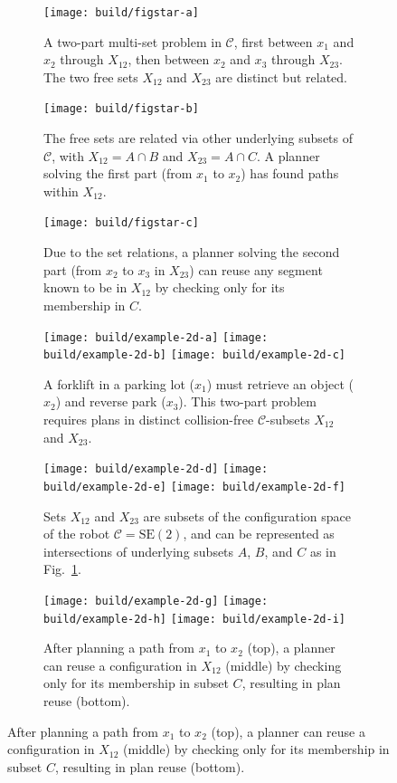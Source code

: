\begin{figure}
\begin{widepage}
\centering

\begin{subfigure}[t]{.32\linewidth}
\centering
\texttt{[image: build/figstar-a]}
\caption{A two-part multi-set problem in $\mathcal{C}$,
  first between $x_1$ and $x_2$ through $X_{12}$,
  then between $x_2$ and $x_3$ through $X_{23}$.
  The two free sets $X_{12}$ and $X_{23}$ are distinct
  but related.}
\end{subfigure}%
\quad%
\begin{subfigure}[t]{.32\linewidth}
\centering
\texttt{[image: build/figstar-b]}
\caption{The free sets are related via other underlying
  subsets of $\mathcal{C}$, with $X_{12}=A \cap B$
  and $X_{23}=A \cap C$.
  A planner solving the first part (from $x_1$ to $x_2$)
  has found paths within $X_{12}$.}
\label{subfig:figstar-intersections}
\end{subfigure}%
\quad%
\begin{subfigure}[t]{.32\linewidth}
\centering
\texttt{[image: build/figstar-c]}
\caption{Due to the set relations,
  a planner solving the second part
  (from $x_2$ to $x_3$ in $X_{23}$)
  can reuse any segment known to be in $X_{12}$
  by checking only for its membership in $C$.}
\end{subfigure}

\vspace{0.1in}

\begin{subfigure}[t]{.32\linewidth}
\centering
\texttt{[image: build/example-2d-a]}
\texttt{[image: build/example-2d-b]}
\texttt{[image: build/example-2d-c]}
\caption{A forklift in a parking lot ($x_1$)
  must retrieve an object ($x_2$)
  and reverse park ($x_3$).
  This two-part problem
  requires plans in distinct collision-free
  $\mathcal{C}$-subsets
  $X_{12}$ and $X_{23}$.}
\label{subfig:figstar-manip-probdef}
\end{subfigure}%
\quad%
\begin{subfigure}[t]{.32\linewidth}
\centering
\texttt{[image: build/example-2d-d]}
\texttt{[image: build/example-2d-e]}
\texttt{[image: build/example-2d-f]}
\caption{Sets $X_{12}$ and $X_{23}$ are subsets of
  the configuration space of the robot $\mathcal{C}=\mbox{SE}(2)$,
  and can be represented as intersections
  of underlying subsets $A$, $B$, and $C$
  as in Fig.~\ref{subfig:figstar-intersections}.}
\label{subfig:figstar-manip-spaces}
\end{subfigure}%
\quad%
\begin{subfigure}[t]{.32\linewidth}
\centering
\texttt{[image: build/example-2d-g]}
\texttt{[image: build/example-2d-h]}
\texttt{[image: build/example-2d-i]}
\caption{After planning a path from $x_1$ to $x_2$ (top),
  a planner can reuse a configuration in $X_{12}$ (middle)
  by checking only for its membership in subset $C$,
  resulting in plan reuse (bottom).}
\end{subfigure}


\end{widepage}
\end{figure}
